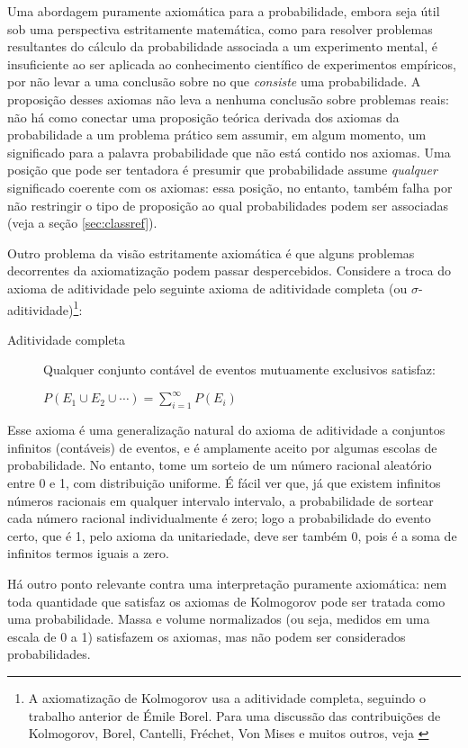 Uma abordagem puramente axiomática para a probabilidade, embora seja útil sob uma perspectiva estritamente matemática, como
para resolver problemas resultantes do cálculo da probabilidade associada a um experimento mental, 
é insuficiente ao ser aplicada ao conhecimento científico de experimentos empíricos, por não
levar a uma conclusão sobre no que {\em consiste} uma probabilidade. A proposição desses axiomas não leva a nenhuma conclusão 
sobre problemas reais: não há como conectar uma proposição teórica derivada dos axiomas da probabilidade a um problema
prático sem assumir, em algum momento, um significado para a palavra probabilidade que não está contido nos axiomas. Uma posição
que pode ser tentadora é presumir que probabilidade assume {\em qualquer} significado coerente com os axiomas: essa posição,
no entanto, também falha por não restringir o tipo de proposição ao qual probabilidades podem ser associadas (veja a seção
\ref{sec:classref}). 

Outro problema da visão estritamente axiomática é que alguns problemas decorrentes da axiomatização podem passar despercebidos. 
Considere a troca do axioma
de aditividade pelo seguinte axioma de aditividade completa (ou $\sigma$-aditividade)\footnote{A 
axiomatização de Kolmogorov usa a aditividade completa, seguindo o trabalho anterior de Émile Borel.
Para uma discussão das contribuições de Kolmogorov, Borel, Cantelli, Fréchet, Von Mises e muitos outros, 
veja \citep{Shafer03}}:

\begin{description}
	\item[Aditividade completa] Qualquer conjunto contável de eventos mutuamente exclusivos satisfaz:

		$P(E_1 \cup E_2 \cup \cdots) = \sum_{i=1}^\infty P(E_i)$
\end{description}

Esse axioma é uma generalização natural do axioma de aditividade a conjuntos infinitos (contáveis) de eventos, e é amplamente
aceito por algumas escolas de probabilidade. No entanto, tome um sorteio de um número racional aleatório entre 0 e 1, com distribuição uniforme. É fácil ver que,
já que existem infinitos números racionais em qualquer intervalo intervalo,
a probabilidade de sortear cada número racional individualmente é zero; logo a probabilidade do evento certo, que é 1, 
pelo axioma da unitariedade, deve ser também 0, pois é a soma de infinitos termos iguais a zero.

Há outro ponto relevante contra uma interpretação puramente axiomática: nem toda quantidade que satisfaz
os axiomas de Kolmogorov pode ser tratada como uma probabilidade. Massa e volume normalizados (ou seja,
medidos em uma escala de 0 a 1) satisfazem os axiomas, mas não podem ser considerados probabilidades.

